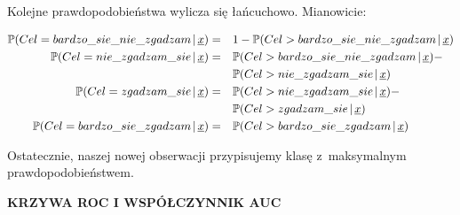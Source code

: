 \documentclass[11pt,usenames,dvipsnames,svgnames,x11names]{beamer}
\theoremstyle{plain}
\theoremstyle{definition}
\theoremstyle{remark}
\begin{document}
\begin{frame}
Kolejne prawdopodobieństwa wylicza się łańcuchowo. Mianowicie:

\begin{footnotesize}
\begin{align*}
\mathbb{P}(Cel = bardzo\_sie\_nie\_zgadzam\hspace{0.5mm}|\hspace{0.5mm}\underline{x})& =&&1-\mathbb{P}(Cel > bardzo\_sie\_nie\_zgadzam\hspace{0.5mm}|\hspace{0.5mm}\underline{x})\\
\mathbb{P}(Cel = nie\_zgadzam\_sie\hspace{0.5mm}|\hspace{0.5mm}\underline{x})&=&&\mathbb{P}(Cel > bardzo\_sie\_nie\_zgadzam\hspace{0.5mm}|\hspace{0.5mm}\underline{x}) - \\
& &&\mathbb{P}(Cel > nie\_zgadzam\_sie\hspace{0.5mm}|\hspace{0.5mm}\underline{x})\\
\mathbb{P}(Cel = zgadzam\_sie\hspace{0.5mm}|\hspace{0.5mm}\underline{x})&=&&\mathbb{P}(Cel > nie\_zgadzam\_sie\hspace{0.5mm}|\hspace{0.5mm}\underline{x}) - \\
& && \mathbb{P}(Cel > zgadzam\_sie\hspace{0.5mm}|\hspace{0.5mm}\underline{x})\\
\mathbb{P}(Cel = bardzo\_sie\_zgadzam\hspace{0.5mm}|\hspace{0.5mm}\underline{x})& =&&\mathbb{P}(Cel > bardzo\_sie\_zgadzam\hspace{0.5mm}|\hspace{0.5mm}\underline{x})
\end{align*}
\end{footnotesize}

Ostatecznie, naszej nowej obserwacji przypisujemy klasę z~maksymalnym prawdopodobieństwem.
\end{frame}

\begin{frame}
\Huge
\centering
\textbf{KRZYWA ROC I WSPÓŁCZYNNIK AUC}
\end{frame}
\end{document}
